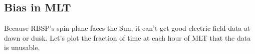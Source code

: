 \subsection{Bias in MLT}

Because RBSP's spin plane faces the Sun, it can't get good electric field data at dawn or dusk. Let's plot the fraction of time at each hour of MLT that the data is unusable. 









